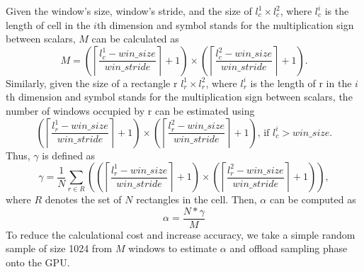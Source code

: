 Given the window's size, window's stride, and the size of $l^1_c \times l^2_c$, where $l^i_c$ is the length of cell in the $i$th dimension and symbol stands for the multiplication sign between scalars, $M$ can be calculated as
\begin{equation}
M = \left(\left\lceil{\frac{l^1_c - win\_size}{win\_stride}}\right\rceil + 1\right) \times \left(\left\lceil{\frac{l^2_c - win\_size}{win\_stride}}\right\rceil + 1\right).
\end{equation}
Similarly, given the size of a rectangle r $l^1_r \times l^2_r$, where $l^i_r$ is the length of r in the $i$th dimension and symbol stands for the multiplication sign between scalars, the number of windows occupied by r can be estimated using
\begin{equation}
\left(\left\lceil{\frac{l^1_r - win\_size}{win\_stride}}\right\rceil + 1\right) \times \left(\left\lceil{\frac{l^2_r - win\_size}{win\_stride}}\right\rceil + 1\right) \mbox{, if $l^i_c > win\_size$}.
\end{equation}
Thus, $\gamma$ is defined as 
\begin{equation}
\gamma = \frac{1}{N}\sum_{r \in R} \left(\left(\left\lceil{\frac{l^1_r - win\_size}{win\_stride}}\right\rceil + 1\right) \times \left(\left\lceil{\frac{l^2_r - win\_size}{win\_stride}}\right\rceil + 1\right)\right),
\end{equation}
where $R$ denotes the set of $N$ rectangles in the cell. Then, $\alpha$ can be computed as 
\begin{equation}
\alpha = \frac{N * \gamma}{M}
\end{equation}
To reduce the calculational cost and increase accuracy, we take a simple random sample of size 1024 from $M$ windows to estimate $\alpha$ and offload sampling phase onto the GPU.


